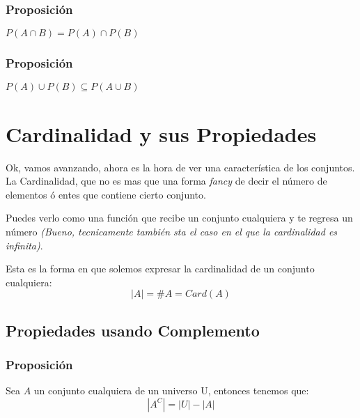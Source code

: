 \documentclass[12pt]{report}                                    %
\begin{document}
            \subsubsection{Proposición}
                $P(A \cap B) = P(A) \cap P(B)$

            \subsubsection{Proposición}
                $P(A) \cup P(B) \subseteq P(A \cup B)$






    \clearpage
    \section{Cardinalidad y sus Propiedades}
            
        Ok, vamos avanzando, ahora es la hora de ver una característica de los conjuntos.
        La Cardinalidad, que no es mas que una forma \emph{fancy} de decir el número de 
        elementos ó entes que contiene cierto conjunto.

        Puedes verlo como una función que recibe un conjunto cualquiera y te regresa
        un número \emph{(Bueno, tecnicamente también sta el caso en el que la cardinalidad es infinita)}.

        Esta es la forma en que solemos expresar la cardinalidad de un conjunto cualquiera:
        \begin{equation}   
            |A| = \#A = Card(A)
        \end{equation}



        \clearpage
        \subsection{Propiedades usando Complemento}
            
            \subsubsection{Proposición}
                Sea $A$ un conjunto cualquiera de un universo U, entonces tenemos que:
                \begin{equation*}
                    |A^C| = |U| - |A|
                \end{equation*}  
\end{document}
